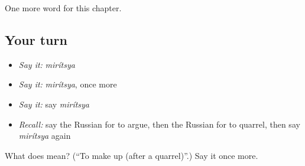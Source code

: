 \begin{grammarlens}[title={What you've built}]
One more word for this chapter.
\end{grammarlens}

\subsection*{Your turn}
\begin{itemize}
\raggedright
  \item \emph{Say it:} \emph{mirítsya}
  \item \emph{Say it:} \emph{mirítsya}, once more
  \item \emph{Say it:} say \emph{mirítsya}
  \item \emph{Recall:} say the Russian for to argue, then the Russian for to quarrel, then say \emph{mirítsya} again
\end{itemize}

\begin{tcolorbox}[breakable,colback=teal!4,colframe=teal!35!black,title={Before you move on}]
What does  mean? (\textquotedblleft{}To make up (after a quarrel)\textquotedblright{}.) Say it once more.
\end{tcolorbox}

